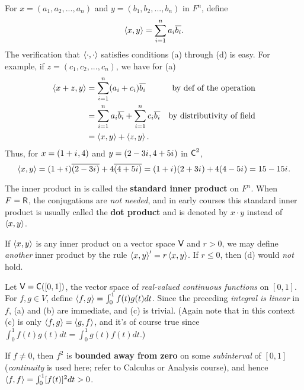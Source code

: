 \begin{example} \label{example 6.1.1}
For \(x = (a_1, a_2, ..., a_n)\) and \(y = (b_1, b_2, ..., b_n)\) in \(F^n\), define
\[
    \left< x, y \right> = \sum_{i = 1}^n a_i \overline{b_i}.
\]
The verification that \(\left< \cdot, \cdot \right>\) satisfies conditions (a) through (d) is easy.
For example, if \(z = (c_1, c_2, ..., c_n)\), we have for (a)
\begin{align*}
    \left< x + z, y \right> & = \sum_{i = 1}^n (a_i + c_i) \overline{b_i} & \text{by def of the operation} \\
    & = \sum_{i = 1}^n a_i \overline{b_i} + \sum_{i = 1}^n c_i \overline{b_i} & \text{by distributivity of field} \\
    & = \left< x, y \right> + \left< z, y \right>.
\end{align*}
Thus, for \(x = (1 + {i\mkern1mu}, 4)\) and \(y = (2 - 3{i\mkern1mu}, 4 + 5{i\mkern1mu})\) in \(\textsf{C}^2\),
\[
    \left< x, y \right> = (1 + {i\mkern1mu})\overline{(2 - 3{i\mkern1mu})} + 4\overline{(4 + 5{i\mkern1mu})} = (1 + {i\mkern1mu})(2 + 3{i\mkern1mu}) + 4(4 - 5{i\mkern1mu}) = 15 - 15{i\mkern1mu}.
\]
\end{example}

\begin{remark} \label{remark 6.1.2}
The inner product in  is called the \textbf{standard inner product} on \(F^n\).
When \(F = \textsf{R}\), the conjugations are \emph{not needed}, and in early courses this standard inner product is usually called the \textbf{dot product} and is denoted by \(x \cdot y\) instead of \(\left< x,y \right>\).
\end{remark}

\begin{example} \label{example 6.1.2}
If \(\left< x, y \right>\) is any inner product on a vector space \(\textsf{V}\) and \(r > 0\), we may define \emph{another} inner product by the rule \(\left< x, y \right>' = r \left< x, y \right>\).
If \(r \le 0\), then (d) would \emph{not} hold.
\end{example}

\begin{example} \label{example 6.1.3}
Let \(\textsf{V} = \textsf{C}([0, 1])\), the vector space of \emph{real-valued continuous functions} on \([0, 1]\).
For \(f, g \in V\), define \(\left< f, g \right> = \int_0^1 f(t)g(t) dt\).
Since the preceding \emph{integral is linear} in \(f\), (a) and (b) are immediate, and (c) is trivial.
(Again note that in this context (c) is only \(\left< f, g \right> = \left< g, f \right>\), and it's of course true since \(\int_0^1 f(t)g(t) dt = \int_0^1 g(t)f(t) dt\).)

If \(f \ne 0\), then \(f^2\) is \textbf{bounded away from zero} on some \emph{subinterval} of \([0, 1]\) (\emph{continuity} is used here; refer to Calculus or Analysis course), and hence \(\left< f, f \right> = \int_0^1 [f(t)]^2 dt > 0\).
\end{example}

